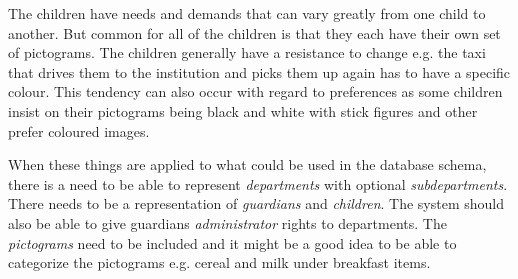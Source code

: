 The children have needs and demands that can vary greatly from one child to another. But common for all of the
children is that they each have their own set of pictograms. The children generally have a resistance to change
e.g. the taxi that drives them to the institution and picks them up again has to have a specific colour. This
tendency can also occur with regard to preferences as some children insist on their pictograms being black and
white with stick figures and other prefer coloured images. 

When these things are applied to what could be used in the database schema, there is a need to be able to
represent \emph{departments} with optional \emph{subdepartments}. There needs to be a representation of
\emph{guardians} and \emph{children}. The system should also be able to give guardians \emph{administrator}
rights to departments. The \emph{pictograms} need to be included and it might be a good idea to be able to
categorize the pictograms e.g. cereal and milk under breakfast items.